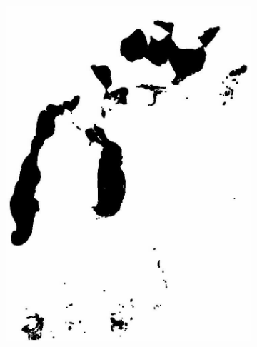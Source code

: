 \documentclass[12pt,a4paper]{article}
\begin{document}
\begin{figure}
\begin{subfigure}[b]{0.19\textwidth}
        \includegraphics[width=\textwidth]{../img/2013w.jpg}
    \end{subfigure}
    \begin{subfigure}[b]{0.19\textwidth}
        \centering

\end{subfigure}
\end{figure}
\end{document}
